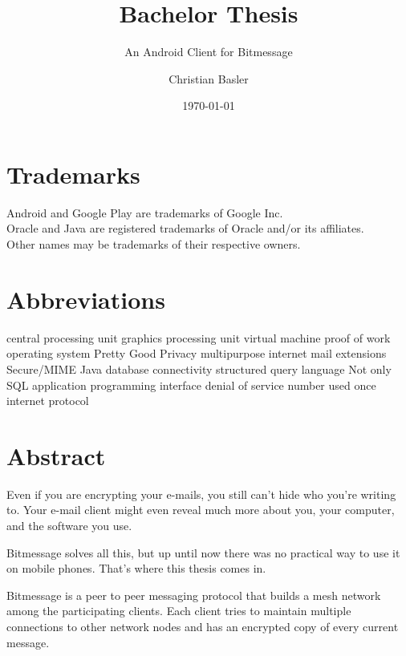 \documentclass{bfh}
\title{Bachelor Thesis}
\subtitle{An Android Client for Bitmessage}
\author{Christian Basler}
\date{\today}
\begin{document}
  \lstset{language=Java}
  \maketitle

  \section*{Trademarks}
  Android and Google Play are trademarks of Google Inc.\\
  Oracle and Java are registered trademarks of Oracle and/or its affiliates.\\
  Other names may be trademarks of their respective owners.

  \section*{Abbreviations}
  \begin{acronym}[S/MIME ]
        {central processing unit}
        {graphics processing unit}
         {virtual machine}
        {proof of work}
         {operating system}
        {Pretty Good Privacy}
       {multipurpose internet mail extensions}
     {Secure/\acs{MIME}}
       {Java database connectivity}
        {structured query language}
      {Not only \acs{SQL}}
        {application programming interface}
        {denial of service}
      {number used once}
         {internet protocol}
  \end{acronym}


  \newpage
  \section*{Abstract}
  Even if you are encrypting your e-mails, you still can't hide who you're writing to. Your e-mail client might even reveal much more about you, your computer, and the software you use.

  Bitmessage solves all this, but up until now there was no practical way to use it on mobile phones. That's where this thesis comes in.


  Bitmessage is a peer to peer messaging protocol that builds a mesh network among the participating clients. Each client tries to maintain multiple connections to other network nodes and has an encrypted copy of every current message.
\end{document}
